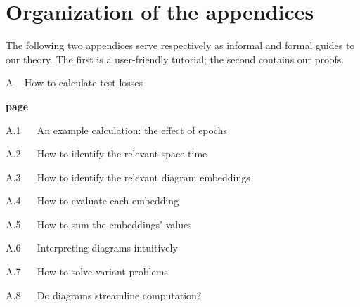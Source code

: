 \documentclass[openany, notitlepage, justified]{tufte-book}
\theoremstyle{plain}
\theoremstyle{definition}
\begin{document}
       
 

\setcounter{secnumdepth}{-1}
    
    {
        
    }
    \restoregeometry
\setcounter{secnumdepth}{1}



\setcounter{chapter}{0}

\chapter*{Organization of the appendices}
    The following two appendices serve respectively as informal and formal
    guides to our theory.  The first is a user-friendly tutorial; the second
    contains our proofs.\\

    {\bf
    \par\noindent A ~ How to calculate test losses}                         \hfill {\bf page \pageref{appendix:tutorial}}
    \par\indent     A.1 ~~ An example calculation: the effect of epochs     \hfill \pageref{appendix:example}
    \par\indent     A.2 ~~ How to identify the relevant space-time          \hfill \pageref{appendix:draw-spacetime} 
    \par\indent     A.3 ~~ How to identify the relevant diagram embeddings  \hfill \pageref{appendix:draw-embeddings}
    \par\indent     A.4 ~~ How to evaluate each embedding                   \hfill \pageref{appendix:evaluate-embeddings}
    \par\indent     A.5 ~~ How to sum the embeddings' values                \hfill \pageref{appendix:sum-embeddings}
    \par\indent     A.6 ~~ Interpreting diagrams intuitively                \hfill \pageref{appendix:interpret-diagrams}
    \par\indent     A.7 ~~ How to solve variant problems                    \hfill \pageref{appendix:solve-variants}
    \par\indent     A.8 ~~ Do diagrams streamline computation?              \hfill \pageref{appendix:diagrams-streamline}
\end{document}
